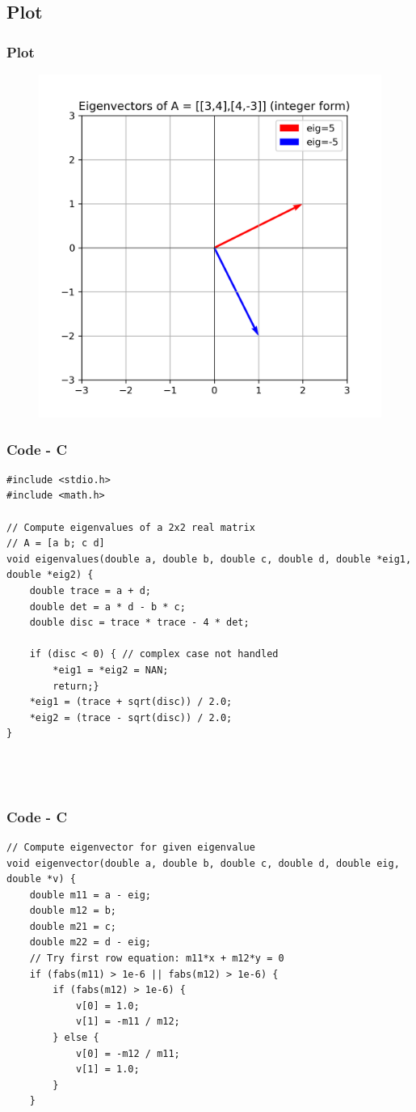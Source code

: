 \documentclass{beamer}
\theoremstyle{remark}
\numberwithin{equation}{section}
\begin{document}
\subsection{Plot}
\begin{frame}
    \frametitle{Plot}
\begin{figure}[H]
   \centering
   \includegraphics[width=0.6\columnwidth]{figs/eigenvectors_problem_adjusted.png}
   \caption{}
   \label{}
   \end{figure}
\end{frame}

\begin{frame}[fragile]
    \frametitle{Code - C}
    \begin{lstlisting}
#include <stdio.h>
#include <math.h>

// Compute eigenvalues of a 2x2 real matrix
// A = [a b; c d]
void eigenvalues(double a, double b, double c, double d, double *eig1, double *eig2) {
    double trace = a + d;
    double det = a * d - b * c;
    double disc = trace * trace - 4 * det;

    if (disc < 0) { // complex case not handled
        *eig1 = *eig2 = NAN;
        return;}
    *eig1 = (trace + sqrt(disc)) / 2.0;
    *eig2 = (trace - sqrt(disc)) / 2.0;
}




    \end{lstlisting}
    \end{frame}

    \begin{frame}[fragile]
    \frametitle{Code - C}
    \begin{lstlisting}
// Compute eigenvector for given eigenvalue
void eigenvector(double a, double b, double c, double d, double eig, double *v) {
    double m11 = a - eig;
    double m12 = b;
    double m21 = c;
    double m22 = d - eig;
    // Try first row equation: m11*x + m12*y = 0
    if (fabs(m11) > 1e-6 || fabs(m12) > 1e-6) {
        if (fabs(m12) > 1e-6) {
            v[0] = 1.0;
            v[1] = -m11 / m12;
        } else {
            v[0] = -m12 / m11;
            v[1] = 1.0;
        }
    }

    \end{lstlisting}
    \end{frame}
\end{document}
